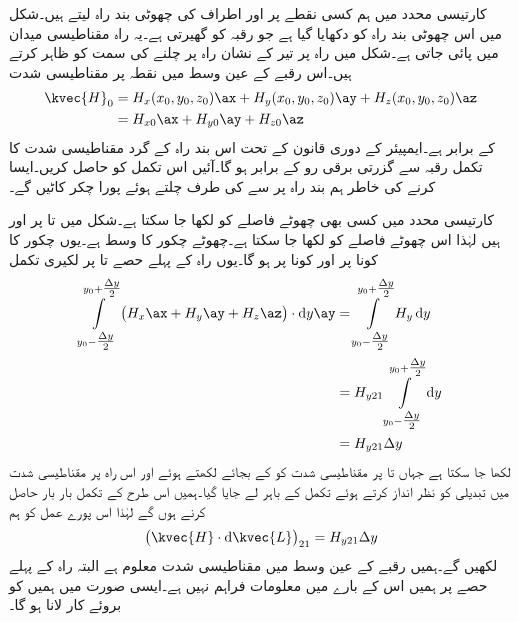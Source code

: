 کارتیسی محدد میں ہم کسی نقطے  پر   اور  اطراف کی چھوٹی بند راہ لیتے ہیں۔شکل  میں اس چھوٹی بند راہ کو دکھایا گیا ہے جو رقبہ  کو گھیرتی ہے۔یہ راہ مقناطیسی میدان  میں پائی جاتی ہے۔شکل میں راہ پر تیر کے نشان راہ پر چلنے کی سمت کو ظاہر کرتے  ہیں۔اس رقبے کے عین وسط میں نقطہ  پر مقناطیسی شدت 
\begin{align*}
\kvec{H}_0&=H_x(x_0,y_0,z_0)\ax+H_y(x_0,y_0,z_0)\ay+H_z(x_0,y_0,z_0)\az\\
&=H_{x0}\ax+H_{y0}\ay+H_{z0}\az
\end{align*}
کے برابر ہے۔ایمپیئر کے دوری قانون کے تحت اس بند راہ کے گرد مقناطیسی شدت کا تکمل رقبہ  سے گزرتی برقی رو کے برابر ہو گا۔آئیں اس تکمل کو حاصل کریں۔ایسا کرنے کی خاطر ہم بند راہ پر سے  کی طرف چلتے ہوئے پورا چکر کاٹیں گے۔

کارتیسی محدد میں کسی بھی چھوٹے فاصلے کو  لکھا جا سکتا ہے۔شکل  میں  تا  پر  اور  ہیں لہٰذا اس چھوٹے فاصلے کو  لکھا جا سکتا ہے۔چھوٹے چکور کا وسط  ہے۔یوں چکور کا  کونا  پر اور  کونا  پر ہو گا۔یوں راہ کے پہلے حصے  تا  پر لکیری تکمل
\begin{align*}
\int\limits_{y_0-\tfrac{\Delta y}{2}}^{y_0+\tfrac{\Delta y}{2}}\left(H_x \ax+H_y\ay+H_z\az \right) \cdot \dif y \ay&=\int\limits_{y_0-\tfrac{\Delta y}{2}}^{y_0+\tfrac{\Delta y}{2}}H_y  \dif y \\
&=H_{y21}\int\limits_{y_0-\tfrac{\Delta y}{2}}^{y_0+\tfrac{\Delta y}{2}}  \dif y \\
&=H_{y21}\Delta y
\end{align*}
لکھا جا سکتا ہے جہاں  تا  پر مقناطیسی شدت کو  کے بجائے  لکھتے ہوئے اور اس راہ پر مقناطیسی شدت میں تبدیلی کو نظر انداز کرتے ہوئے  تکمل کے باہر لے جایا گیا۔ہمیں اس طرح کے تکمل بار بار حاصل کرنے ہوں گے لہٰذا اس پورے عمل کو ہم
\begin{align}\label{مساوات_مقناطیسی_پہلے_حصہ_تکمل}
\left( \kvec{H} \cdot \dif \kvec{L}\right)_{21}=H_{y21} \Delta y 
\end{align}
لکھیں گے۔ہمیں رقبے کے عین وسط میں مقناطیسی شدت معلوم ہے البتہ راہ کے پہلے حصے پر ہمیں اس کے بارے میں معلومات فراہم نہیں ہے۔ایسی صورت میں ہمیں  کو بروئے کار لانا ہو گا۔

